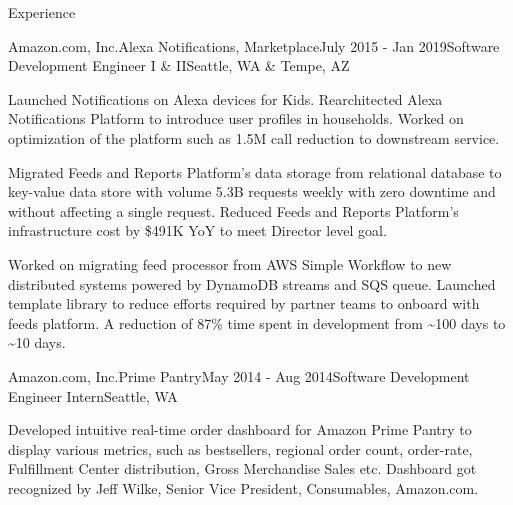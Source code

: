 \documentclass{resume} %
\begin{document}
\begin{rSection}{Experience}
    \begin{rSubsection}{Amazon.com, Inc.}{Alexa Notifications, Marketplace}{July 2015 - Jan 2019}{Software Development Engineer I \& II}{Seattle, WA \& Tempe, AZ}
        \item Launched Notifications on Alexa devices for Kids. Rearchitected Alexa Notifications Platform to introduce user profiles in households. Worked on optimization of the platform such as 1.5M call reduction to downstream service.
        \item Migrated Feeds and Reports Platform's data storage from relational database to key-value data store with volume 5.3B requests weekly with zero downtime and without affecting a single request. Reduced Feeds and Reports Platform's infrastructure cost by \$491K YoY to meet Director level goal.
        \item Worked on migrating feed processor from AWS Simple Workflow to new distributed systems powered by DynamoDB streams and SQS queue. Launched template library to reduce efforts required by partner teams to onboard with feeds platform. A reduction of 87\% time spent in development from \~{}100 days to \~{}10 days.
    \end{rSubsection}

    \begin{rSubsection}{Amazon.com, Inc.}{Prime Pantry}{May 2014 - Aug 2014}{Software Development Engineer Intern}{Seattle, WA}
        \item Developed intuitive real-time order dashboard for Amazon Prime Pantry to display various metrics, such as bestsellers, regional order count, order-rate, Fulfillment Center distribution, Gross Merchandise Sales etc. Dashboard got recognized by Jeff Wilke, Senior Vice President, Consumables, Amazon.com.
    \end{rSubsection}

\end{rSection}

\end{document}
